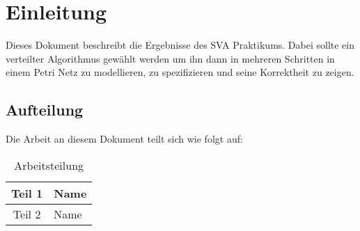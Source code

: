 \newpage
\section{Einleitung}
Dieses Dokument beschreibt die Ergebnisse des SVA Praktikums. Dabei sollte ein verteilter Algorithmus gewählt werden um ihn dann in mehreren Schritten in einem Petri Netz zu modellieren, zu spezifizieren und seine Korrektheit zu zeigen.

\subsection{Aufteilung}
Die Arbeit an diesem Dokument teilt sich wie folgt auf:

\begin{table}[H]
\centering
\label{edmCats}
 \begin{tabular}{|c|l|}
 \hline
 	Teil 1 & Name\\
 \hline
	Teil 2 & Name\\
 \hline	
 \end{tabular}
\caption{Arbeitsteilung}
\end{table}